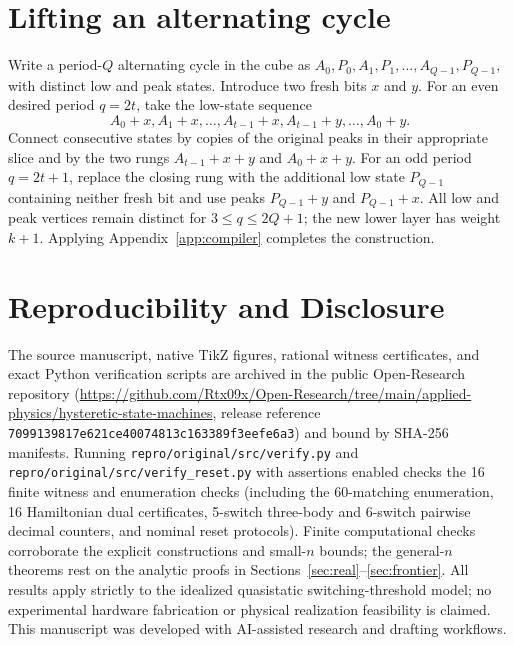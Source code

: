 \documentclass[12pt,letterpaper]{article}
\theoremstyle{definition}\newtheorem{definition}[theorem]{Definition}
\theoremstyle{remark}\newtheorem{remark}[theorem]{Remark}
\begin{document}
\section{Lifting an alternating cycle}\label{app:lift}
Write a period-$Q$ alternating cycle in the cube as $A_0,P_0,A_1,P_1,\ldots,A_{Q-1},P_{Q-1}$, with distinct low and peak states. Introduce two fresh bits $x$ and $y$. For an even desired period $q=2t$, take the low-state sequence
\[
 A_0+x, A_1+x,\ldots,A_{t-1}+x,A_{t-1}+y,\ldots,A_0+y.
\]
Connect consecutive states by copies of the original peaks in their appropriate slice and by the two rungs $A_{t-1}+x+y$ and $A_0+x+y$. For an odd period $q=2t+1$, replace the closing rung with the additional low state $P_{Q-1}$ containing neither fresh bit and use peaks $P_{Q-1}+y$ and $P_{Q-1}+x$. All low and peak vertices remain distinct for $3\le q\le2Q+1$; the new lower layer has weight $k+1$. Applying Appendix~\ref{app:compiler} completes the construction.

\clearpage
\begingroup
\small
\setlength{\bibsep}{1pt}

\section*{Reproducibility and Disclosure}
The source manuscript, native TikZ figures, rational witness certificates, and exact Python verification scripts are archived in the public Open-Research repository (\url{https://github.com/Rtx09x/Open-Research/tree/main/applied-physics/hysteretic-state-machines}, release reference \texttt{7099139817e621ce40074813c163389f3eefe6a3}) and bound by SHA-256 manifests. Running \texttt{repro/original/src/verify.py} and \texttt{repro/original/src/verify\_reset.py} with assertions enabled checks the 16 finite witness and enumeration checks (including the 60-matching enumeration, 16 Hamiltonian dual certificates, 5-switch three-body and 6-switch pairwise decimal counters, and nominal reset protocols). Finite computational checks corroborate the explicit constructions and small-$n$ bounds; the general-$n$ theorems rest on the analytic proofs in Sections~\ref{sec:real}--\ref{sec:frontier}. All results apply strictly to the idealized quasistatic switching-threshold model; no experimental hardware fabrication or physical realization feasibility is claimed. This manuscript was developed with AI-assisted research and drafting workflows.



\endgroup
\end{document}
